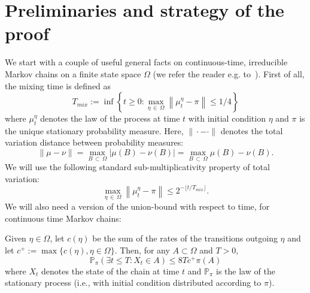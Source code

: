 \documentclass[AHL,Unicode,longabstracts,published]{cedram}
\renewcommand{\P}{\mathbb{P}}
\let\oldexists\exists
\renewcommand*{\exists}{\mathrel{\oldexists}}
\begin{document}
\section{Preliminaries and strategy of the proof}\label{sec:prelsketch}
We start with a couple of useful general facts on continuous-time, irreducible Markov chains on a finite state space $\Omega$ (we refer the reader e.g. to~\cite{LP}). First of all, the mixing time is defined as
\begin{equation}\label{eq:defTmix}
T_{mix}:=\inf\left\{t\ge0: \max_{\eta\,\in\,\Omega}\left\|\mu_t^\eta-\pi\right\|\le 1/4\right\}
\end{equation}
where $\mu_t^\eta$ denotes the law of the process at time $t$ with initial condition $\eta$ and $\pi$ is the unique stationary probability measure. Here, $\|\cdot-\cdot\|$ denotes the total variation distance between probability measures:
\begin{equation}
\|\mu-\nu\|=\max_{B\,\subset\,\Omega}|\mu(B)-\nu(B)|=\max_{B\,\subset\,\Omega}\mu(B)-\nu(B).
\end{equation}
We will use the following standard sub-multiplicativity property of total variation:
\begin{equation}\label{eq:submult}
\max_{\eta\,\in\,\Omega}\left\|\mu_t^\eta-\pi\right\|\le 2^{-\lfloor t/T_{mix}\rfloor}.
\end{equation}
We will also need a version of the union-bound with respect to time, for continuous time Markov chains:
\begin{lemm}
Given $\eta\in \Omega$, let $c(\eta)$ be the sum of the rates of the transitions outgoing $\eta$ and let $c^+:=\max\{c(\eta),\eta\in\Omega\}$. Then, for any $A\subset \Omega$ and $T>0$,
\begin{equation}\label{eq:unionboundt}
\P_\pi(\exists t\le T: X_t\in A)\le 8Tc^+\pi(A)
\end{equation}
where $X_t$ denotes the state of the chain at time $t$ and $\P_\pi$ is the law of the stationary process (i.e., with initial condition distributed according to $\pi$).
\end{lemm}
\end{document}
